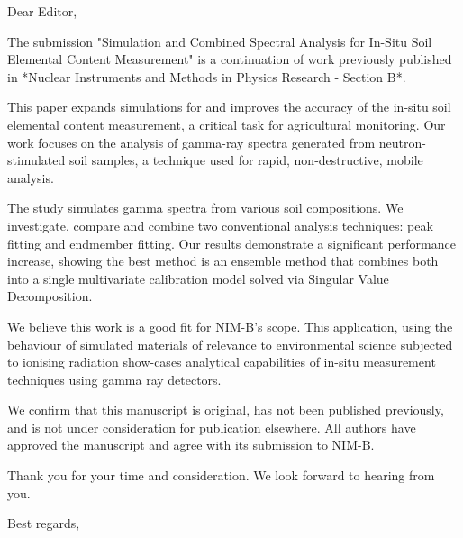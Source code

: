 \documentclass[10pt]{letter}
\begin{document}
\begin{letter}{
}

\opening{Dear Editor,}

The submission "Simulation and Combined Spectral Analysis for In-Situ Soil Elemental Content Measurement" is a continuation of work previously published in *Nuclear Instruments and Methods in Physics Research - Section B*.

This paper expands simulations for and improves the accuracy of the in-situ soil elemental content measurement, a critical task for agricultural monitoring. Our work focuses on the analysis of gamma-ray spectra generated from neutron-stimulated soil samples, a technique used for rapid, non-destructive, mobile analysis.

The study simulates gamma spectra from various soil compositions. We investigate, compare and combine two conventional analysis techniques: peak fitting and endmember fitting. Our results demonstrate a significant performance increase, showing the best method is an ensemble method that combines both into a single multivariate calibration model solved via Singular Value Decomposition.

We believe this work is a good fit for NIM-B's scope. This application, using the behaviour of simulated materials of relevance to environmental science subjected to ionising radiation show-cases analytical capabilities of in-situ measurement techniques using gamma ray detectors. 

We confirm that this manuscript is original, has not been published previously, and is not under consideration for publication elsewhere. All authors have approved the manuscript and agree with its submission to NIM-B.

Thank you for your time and consideration. We look forward to hearing from you.

\closing{Best regards,}
 
\end{letter}
\end{document}
